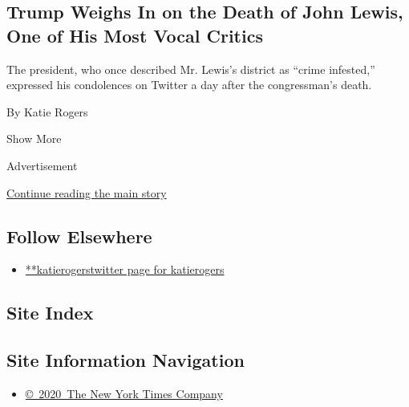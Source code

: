 \begin{enumerate}
  \hypertarget{trump-weighs-in-on-the-death-of-john-lewis-one-of-his-most-vocal-critics}{%
  \subsection{Trump Weighs In on the Death of John Lewis, One of His
  Most Vocal
  Critics}\label{trump-weighs-in-on-the-death-of-john-lewis-one-of-his-most-vocal-critics}}

  The president, who once described Mr. Lewis's district as ``crime
  infested,'' expressed his condolences on Twitter a day after the
  congressman's death.

  By Katie Rogers
\end{enumerate}

Show More

Advertisement

\protect\hyperlink{after-mid2}{Continue reading the main story}

\hypertarget{follow-elsewhere}{%
\subsection{Follow Elsewhere}\label{follow-elsewhere}}

\begin{itemize}
\tightlist
\item
  \href{https://twitter.com/katierogers}{**katierogerstwitter page for
  katierogers}
\end{itemize}

\hypertarget{site-index}{%
\subsection{Site Index}\label{site-index}}

\hypertarget{site-information-navigation}{%
\subsection{Site Information
Navigation}\label{site-information-navigation}}

\begin{itemize}
\tightlist
\item
  \href{https://help.nytimes3xbfgragh.onion/hc/en-us/articles/115014792127-Copyright-notice}{©~2020~The
  New York Times Company}
\end{itemize}

